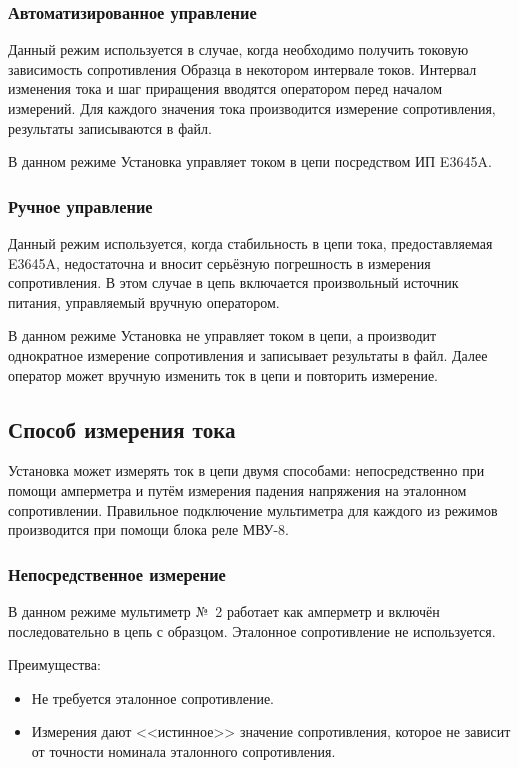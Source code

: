 \documentclass[12pt, a4paper, twocolumn]{book}
\begin{document}
\subsubsection{Автоматизированное управление}
\label{sec_auto_current}

Данный режим используется в случае, когда необходимо получить токовую зависимость сопротивления Образца в некотором интервале токов. Интервал изменения тока и шаг приращения вводятся оператором перед началом измерений. Для каждого значения тока производится измерение сопротивления, результаты записываются в файл.

В данном режиме Установка управляет током в цепи посредством ИП E3645A.

\subsubsection{Ручное управление}
\label{sec_manual_current}

Данный режим используется, когда стабильность в цепи тока, предоставляемая E3645A, недостаточна и вносит серьёзную погрешность в измерения сопротивления. В этом случае в цепь включается произвольный источник питания, управляемый вручную оператором.

В данном режиме Установка не управляет током в цепи, а производит однократное измерение сопротивления и записывает результаты в файл. Далее оператор может вручную изменить ток в цепи и повторить измерение.

\subsection{Способ измерения тока}

Установка может измерять ток в цепи двумя способами: непосредственно при помощи амперметра и путём измерения падения напряжения на эталонном сопротивлении. Правильное подключение мультиметра для каждого из режимов производится при помощи блока реле МВУ-8.

\subsubsection{Непосредственное измерение}
\label{sec_direct_measure}

В данном режиме мультиметр №~2 работает как амперметр и включён последовательно в цепь с образцом. Эталонное сопротивление не используется.

Преимущества:

\begin{itemize}
\item Не требуется эталонное сопротивление.
\item Измерения дают <<истинное>> значение сопротивления, которое не зависит от точности номинала эталонного сопротивления.
\end{itemize}
\end{document}
